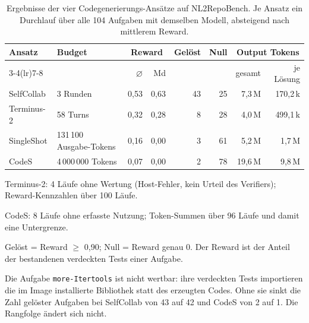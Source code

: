 \begin{table}[H]
  \centering
  \begin{threeparttable}
    \caption[Kennzahlen der vier Codegenerierungs-Ansätze]{Ergebnisse der vier Codegenerierungs-Ansätze auf NL2RepoBench. Je Ansatz ein Durchlauf über alle 104 Aufgaben mit demselben Modell, absteigend nach mittlerem Reward.}
    \label{tab:kennzahlen-arme}
    \footnotesize
    \begin{tabularx}{\textwidth}{@{}lXrrrrrr@{}}
      \toprule
      Ansatz & Budget & \multicolumn{2}{c}{Reward} & Gelöst & Null & \multicolumn{2}{c}{Output Tokens} \\ \cmidrule(lr){3-4}\cmidrule(lr){7-8}
       &  & $\varnothing$ & Md &  &  & gesamt & je Lösung \\
      \midrule
      SelfCollab & 3 Runden & 0,53 & 0,63 & 43 & 25 & 7,3\,M & 170,2\,k \\
      Terminus-2\tnote{a} & 58 Turns & 0,32 & 0,28 & 8 & 28 & 4,0\,M & 499,1\,k \\
      SingleShot & 131\,100 Ausgabe-Tokens & 0,16 & 0,00 & 3 & 61 & 5,2\,M & 1,7\,M \\
      CodeS\tnote{b} & 4\,000\,000 Tokens & 0,07 & 0,00 & 2 & 78 & 19,6\,M & 9,8\,M \\
      \bottomrule
    \end{tabularx}
    \begin{tablenotes}[flushleft]
      \footnotesize
      \item[a] Terminus-2: 4 Läufe ohne Wertung (Host-Fehler, kein Urteil des Verifiers); Reward-Kennzahlen über 100 Läufe.
      \item[b] CodeS: 8 Läufe ohne erfasste Nutzung; Token-Summen über 96 Läufe und damit eine Untergrenze.
      \item[] Gelöst = Reward $\geq$ 0,90; Null = Reward genau 0. Der Reward ist der Anteil der bestandenen verdeckten Tests einer Aufgabe.
      \item[] Die Aufgabe \texttt{more-Itertools} ist nicht wertbar: ihre verdeckten Tests importieren die im Image installierte Bibliothek statt des erzeugten Codes. Ohne sie sinkt die Zahl gelöster Aufgaben bei SelfCollab von 43 auf 42 und CodeS von 2 auf 1. Die Rangfolge ändert sich nicht.
    \end{tablenotes}
  \end{threeparttable}
\end{table}
